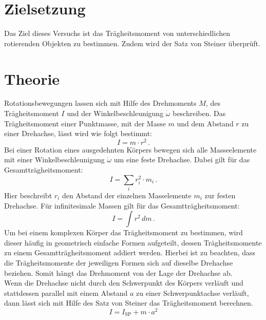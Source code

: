\section{Zielsetzung}
\label{sec:Zielsetzung}
Das Ziel dieses Versuchs ist das Trägheitsmoment von unterschiedlichen rotierenden Objekten zu bestimmen. 
Zudem wird der Satz von Steiner überprüft.
%
\section{Theorie}
\label{sec:Theorie}
Rotationsbewegungen lassen sich mit Hilfe des Drehmoments $M$, des Trägheitsmoment $I$ und 
der Winkelbeschleunigung $\dot{\omega}$ beschreiben. Das Trägheitsmoment einer Punktmasse, 
mit der Masse $m$ und dem Abstand $r$ zu einer Drehachse, lässt wird wie folgt bestimmt:
\begin{equation}
    I = m \cdot r^{2}\,.
    \label{eqn:TragheitPunktmasse}
\end{equation}
%
Bei einer Rotation eines ausgedehnten Körpers bewegen sich alle Masseelemente mit einer 
Winkelbeschleunigung $\dot{\omega}$ um eine feste Drehachse. Dabei gilt für das Gesamtträgheitsmoment:
\begin{equation}
    I = \sum_{i} r_{i}^{2} \cdot m_{i}\, .
    \label{eqn:GesamttragheitSumme}
\end{equation}
%
Hier beschreibt $r_{i}$ den Abstand der einzelnen Masselemente $m_{i}$ zur festen Drehachse.
Für infinitesimale Massen gilt für das Gesamtträgheitsmoment:
\begin{equation}
    I = \int r^{2}\,dm \,.
    \label{eqn:GesamttragheitIntegral}
\end{equation}
%
Um bei einem komplexen Körper das Trägheitsmoment zu bestimmen, wird dieser häufig in 
geometrisch einfache Formen aufgeteilt, dessen Trägheitsmomente zu einem Gesamtträgheitsmoment 
addiert werden. Hierbei ist zu beachten, dass die Trägheitsmomente der jeweiligen Formen sich
auf dieselbe Drehachse beziehen. Somit hängt das Drehmoment von der Lage der Drehachse ab. \\
%
Wenn die Drehachse nicht durch den Schwerpunkt des Körpers verläuft und stattdessen parallel 
mit einem Abstand $a$ zu einer Schwerpunktachse verläuft, dann lässt sich mit Hilfe des Satz von Steiner
das Trägheitsmoment berechnen.
\begin{equation}
    I = I_{\text{SP}} + m \cdot a^{2}
    \label{eqn:SatzVonSteiner}
\end{equation}
